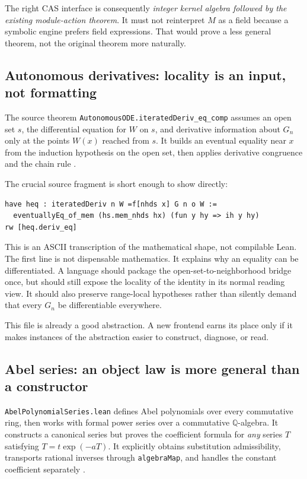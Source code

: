 \documentclass[11pt,letterpaper]{article}
\newcommand{\code}[1]{\nolinkurl{#1}}
\newcommand{\Q}{\mathbb Q}
\numberwithin{equation}{section}
\begin{document}
The right CAS interface is consequently \emph{integer kernel algebra followed
by the existing module-action theorem}. It must not reinterpret $M$ as a field
because a symbolic engine prefers field expressions. That would prove a less
general theorem, not the original theorem more naturally.

\subsection{Autonomous derivatives: locality is an input, not formatting}
The source theorem \code{AutonomousODE.iteratedDeriv_eq_comp} assumes an open set
$s$, the differential equation for $W$ on $s$, and derivative information about
$G_n$ only at the points $W(x)$ reached from $s$. It builds an eventual equality
near $x$ from the induction hypothesis on the open set, then applies derivative
congruence and the chain rule \cite{p-ode}.

The crucial source fragment is short enough to show directly:
\par\noindent\begin{minipage}{\linewidth}
\begin{lstlisting}
have heq : iteratedDeriv n W =f[nhds x] G n o W :=
  eventuallyEq_of_mem (hs.mem_nhds hx) (fun y hy => ih y hy)
rw [heq.deriv_eq]
\end{lstlisting}
\end{minipage}\par

This is an ASCII transcription of the mathematical shape, not compilable Lean.
The first line is not dispensable mathematics. It explains why an equality can
be differentiated. A language should package the open-set-to-neighborhood bridge
once, but should still expose the locality of the identity in its normal reading
view. It should also preserve range-local hypotheses rather than silently demand
that every $G_n$ be differentiable everywhere.

This file is already a good abstraction. A new frontend earns its place only if
it makes instances of the abstraction easier to construct, diagnose, or read.

\subsection{Abel series: an object law is more general than a constructor}
\code{AbelPolynomialSeries.lean} defines Abel polynomials over every commutative
ring, then works with formal power series over a commutative $\Q$-algebra. It
constructs a canonical series but proves the coefficient formula for
\emph{any} series $T$ satisfying $T=t\exp(-aT)$. It explicitly obtains substitution
admissibility, transports rational inverses through \code{algebraMap}, and handles
the constant coefficient separately \cite{p-abel}.
\end{document}
